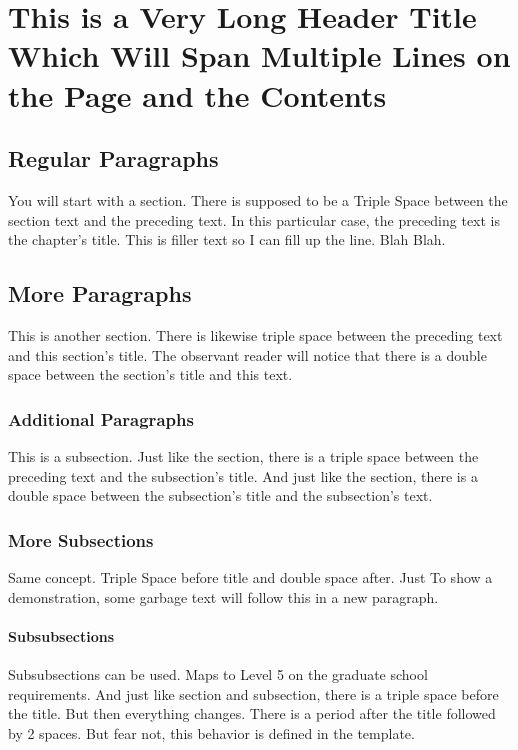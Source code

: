 \chapter{This is a Very Long Header Title Which Will Span Multiple Lines on the Page and the Contents}
\label{chapter:ch2}

\section{Regular Paragraphs}
You will start with a section.
There is supposed to be a Triple Space between the section text and the preceding text.
In this particular case, the preceding text is the chapter's title.
This is filler text so I can fill up the line. Blah Blah.

\section{More Paragraphs}
This is another section.
There is likewise triple space between the preceding text and this section's title.
The observant reader will notice that there is a double space between the section's title and this text.

\subsection{Additional Paragraphs}
This is a subsection.
Just like the section, there is a triple space between the preceding text and the subsection's title.
And just like the section, there is a double space between the subsection's title and the subsection's text.

\subsection{More Subsections}
Same concept. Triple Space before title and double space after.
Just To show a demonstration, some garbage text will follow this in a new paragraph.

\lipsum[1]

\subsubsection{Subsubsections}
Subsubsections can be used. Maps to Level 5 on the graduate school requirements.
And just like section and subsection, there is a triple space before the title.
But then everything changes.
There is a period after the title followed by 2 spaces.
But fear not, this behavior is defined in the template.

